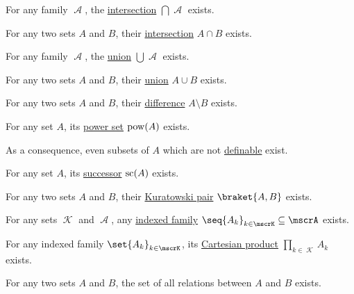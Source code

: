 \begin{proposition}
\begin{thmenum}
     For any  family \( \mscrA \), the \hyperref[def:basic_set_operations/intersection]{intersection} \( \bigcap \mscrA \) exists.

     For any two sets \( A \) and \( B \), their \hyperref[def:basic_set_operations/intersection]{intersection} \( A \cap B \) exists.

     For any family \( \mscrA \), the \hyperref[def:basic_set_operations/union]{union} \( \bigcup \mscrA \) exists.

     For any two sets \( A \) and \( B \), their \hyperref[def:basic_set_operations/union]{union} \( A \cup B \) exists.

     For any two sets \( A \) and \( B \), their \hyperref[def:basic_set_operations/difference]{difference} \( A \setminus B \) exists.

     For any set \( A \), its \hyperref[def:basic_set_operations/power_set]{power set} \( \operatorname{pow}(A) \) exists.

    As a consequence, even subsets of \( A \) which are not \hyperref[def:first_order_definability]{definable} exist.

     For any set \( A \), its \hyperref[def:ordinal_successor]{successor} \( \op{sc}(A) \) exists.

     For any two sets \( A \) and \( B \), their \hyperref[def:cartesian_product/kuratowski_pair]{Kuratowski pair} \( \braket{ A, B } \) exists.

     For any sets \( \mscrK \) and \( \mscrA \), any \hyperref[def:cartesian_product/indexed_family]{indexed family} \( \seq{ A_k }_{k \in \mscrK} \subseteq \mscrA \) exists.

     For any indexed family \( \set{ A_k }_{k \in \mscrK} \), its \hyperref[def:cartesian_product]{Cartesian product} \( \prod_{k \in \mscrK} A_k \) exists.

     For any two sets \( A \) and \( B \), the set of all relations between \( A \) and \( B \) exists.


\end{thmenum}
\end{proposition}
